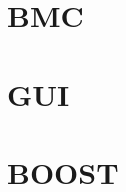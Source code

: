 \section{BMC}

\subsection*{}

\subsection*{}

\subsection*{}



\section{GUI}

\subsection*{}

\subsection*{}

\subsection*{}


\section{BOOST}

\subsection*{}

\subsection*{}

\subsection*
{}
